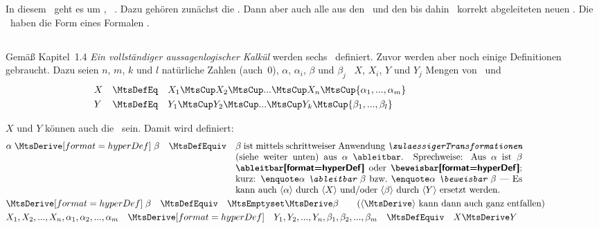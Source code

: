 \section[Schlussregeln]{\Schlussregeln}%
\beginsection          {\Schlussregeln}
\label              {sec:Schlussregeln}

In diesem \sectionname\ geht es um \zulaessigeTransformationen, \textdh\ \allgemeingueltigeSchlussregeln.
Dazu gehören zunächst die \Basisregeln.
Dann aber auch alle aus den \Basisregeln\ und den bis dahin \allgemeingueltigenSchlussregeln\ korrekt abgeleiteten neuen \Schlussregeln.
Die \Schlussregeln\ haben die Form eines Formalen \Satzes.

\subsection[Basisregeln]{\Basisregeln}%
\label               {sub:Basisregeln}

Gemäß \cite{bib:Rautenberg} Kapitel~1.4 \emph{Ein vollständiger aussagenlogischer Kalkül} werden sechs \Basisregeln\ definiert. Zuvor werden aber noch einige Definitionen gebraucht. Dazu seien $n$, $m$, $k$ und $l$ natürliche Zahlen (auch~0), $\alpha$, $\alpha_i$, $\beta$ und $\beta_j$ \Formeln\, $X$, $X_i$, $Y$ und $Y_j$ Mengen von \Formeln\ und
\begin{align}
	&X&&\MtsDefEq&&X_1\MtsCup X_2\MtsCup...\MtsCup X_n\MtsCup\{\alpha_1,...,\alpha_m\}
	\\
	&Y&&\MtsDefEq&&Y_1\MtsCup Y_2\MtsCup...\MtsCup Y_k\MtsCup\{\beta_1, ...,\beta_l \}
	\formulatoleft\formulatoleft
\end{align}

$X$ und $Y$ können auch die \leereMenge\ sein. Damit wird definiert:
\begin{align}
	& \alpha \defSymBin{\MtsDerive} \beta \quad \MtsDefEquiv \quad
	\parbox[t]{11cm}{%
	$\beta$ ist mittels schrittweiser Anwendung \emph{\zulaessigerTransformationen} (siehe weiter unten) aus $\alpha$ \ableitbar.
	Sprechweise: Aus $\alpha$ ist $\beta$ \defTxt{\ableitbar} oder \defTxt{\beweisbar};
	kurz: \standsfor{$\alpha$ \emph{\ableitbar} $\beta$} \textbzw\ \standsfor{$\alpha$ \emph{\beweisbar} $\beta$}
	--- Es kann auch \chrqt{$\alpha$} durch \chrqt{$X$} und/oder \chrqt{$\beta$} durch \chrqt{$Y$} ersetzt werden.
	}
	\label{def:ableitbar}
	\\
	& \defSymUna{\MtsDerive} \beta \quad \MtsDefEquiv \quad \MtsEmptyset \MtsDerive \beta \qquad \text{(\chrqt{\MtsDerive} kann dann auch ganz entfallen)}
	\\
	& X_1,X_2,...,X_n,\alpha_1,\alpha_2,...,\alpha_m\quad
	\defSym{\MtsDerive}\quad Y_1,Y_2,...,Y_n, \beta_1, \beta_2,..., \beta_m\quad
	\MtsDefEquiv \quad X \MtsDerive Y
	\label{def:ableitbarKurz}
	\formulatoleft
\end{align}


